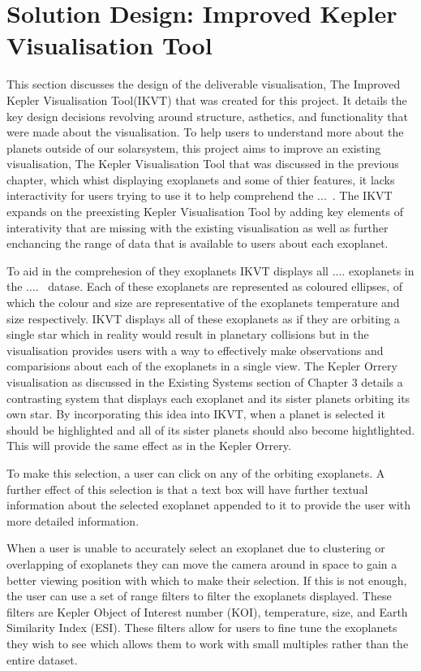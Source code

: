 \chapter{Solution Design: Improved Kepler Visualisation Tool}\label{C:sd}

This section discusses the design of the deliverable visualisation, The Improved Kepler Visualisation Tool(IKVT) that was created for this project. It details the key design decisions revolving around structure, asthetics, and functionality that were made about the visualisation. 
To help users to understand more about the planets outside of our solarsystem, this project aims to improve an existing visualisation, The Kepler Visualisation Tool that was discussed in the previous chapter, which whist displaying exoplanets and some of thier features, it lacks interactivity for users trying to use it to help comprehend the ...~. The IKVT expands on the preexisting Kepler Visualisation Tool by adding key elements of interativity that are missing with the existing visualisation as well as further enchancing the range of data that is available to users about each exoplanet.

To aid in the comprehesion of they exoplanets IKVT displays all .... exoplanets in the ....~ datase. Each of these exoplanets are represented as coloured ellipses, of which the colour and size are representative of the exoplanets temperature and size respectively. IKVT displays all of these exoplanets as if they are orbiting a single star which in reality would result in planetary collisions but in the visualisation provides users with a way to effectively make observations and comparisions about each of the exoplanets in a single view. The Kepler Orrery visualisation as discussed in the Existing Systems section of Chapter 3 details a contrasting system that displays each exoplanet and its sister planets orbiting its own star. By incorporating this idea into IKVT, when a planet is selected it should be highlighted and all of its sister planets should also become hightlighted. This will provide the same effect as in the Kepler Orrery.  

To make this selection, a user can click on any of the orbiting exoplanets.  A further effect of this selection is that a text box will have further textual information about the selected exoplanet appended to it to provide the user with more detailed information.

When a user is unable to accurately select an exoplanet due to clustering or overlapping of exoplanets they can move the camera around in space to gain a better viewing position with which to make their selection. If this is not enough, the user can use a set of range filters to filter the exoplanets displayed. These filters are Kepler Object of Interest number (KOI), temperature, size, and Earth Similarity Index (ESI). These filters allow for users to fine tune the exoplanets they wish to see which allows them to work with small multiples rather than the entire dataset.



